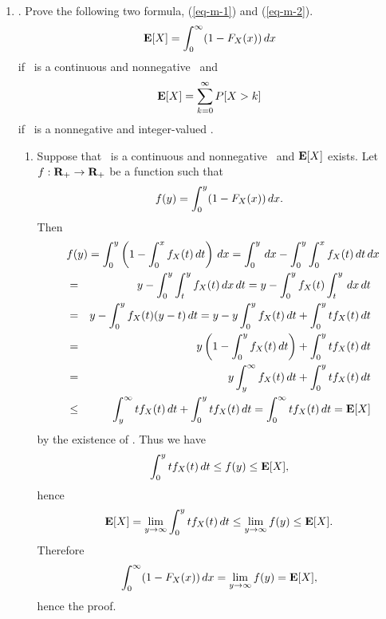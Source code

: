 \begin{enumerate}
	\item {}.
	Prove the following two formula, (\ref{eq-m-1}) and (\ref{eq-m-2}).
	\begin{equation}
	\label{eq-m-1}
		{\bf E}[X] = \int_0^\infty (1-F_{X}(x)) {\, dx}
	\end{equation}
	if \X\ is a continuous and nonnegative \randvar\
	and
	\begin{equation}
	\label{eq-m-2}
		{\bf E}[X] = \sum_{k=0}^{\infty} P[X>k]
	\end{equation}
	if \X\ is a nonnegative and integer-valued \randvar.
	\ifdefined\sol
	\begin{solution}
	\begin{enumerate}
		\item Suppose that \X\ is a continuous and nonnegative \randvar\
		and ${\bf E}[X]$ exists.
		Let $f:{{\mbox{\bf R}}_+} \to {{\mbox{\bf R}}_+}$ be a function such that
		\[
			f(y) = \int_0^y (1-F_{X}(x)) {\, dx}.
		\]
		Then
		\begin{eqnarray*}
			\lefteqn{
			f(y) = \int_0^y \left(1-\int_0^x \pdfxk{t} \dt \right) \dx
			= \int_0^y \dx - \int_0^y \int_0^x \pdfxk{t} \dt \dx
			}
			\\
			&=& y - \int_0^y \int_t^y \pdfxk{t} \dx \dt
			= y - \int_0^y \pdfxk{t} \int_t^y \dx \dt
			\\
			&=& y - \int_0^y \pdfxk{t} (y-t) \dt
			= y - y \int_0^y \pdfxk{t} \dt + \int_0^y t \pdfxk{t} \dt
			\\
			&=& y \left( 1 -  \int_0^y \pdfxk{t} \dt \right) + \int_0^y t \pdfxk{t} \dt
			\\
			&=& y \int_y^\infty \pdfxk{t} \dt + \int_0^y t \pdfxk{t} \dt
			\\
			&\leq& \int_y^\infty t \pdfxk{t} \dt + \int_0^y t \pdfxk{t} \dt
			= \int_0^\infty t \pdfxk{t} \dt = 
		\end{eqnarray*}
		by the existence of \Exp{X}.
		Thus we have
		\[
			\int_0^y t f_{X}(t) {\, dt} \leq f(y) \leq {\bf E}[X],
		\]
		hence
		\[
			{\bf E}[X] = \lim_{y\to\infty} \int_0^y t f_{X}(t) {\, dt}
			\leq \lim_{y\to\infty} f(y) \leq {\bf E}[X].
		\]
		Therefore
		\[
			\int_0^\infty (1-F_{X}(x)) {\, dx}
			= \lim_{y\to\infty} f(y) = {\bf E}[X],
		\]
		hence the proof.


\end{enumerate}
\end{solution}
\end{enumerate}
